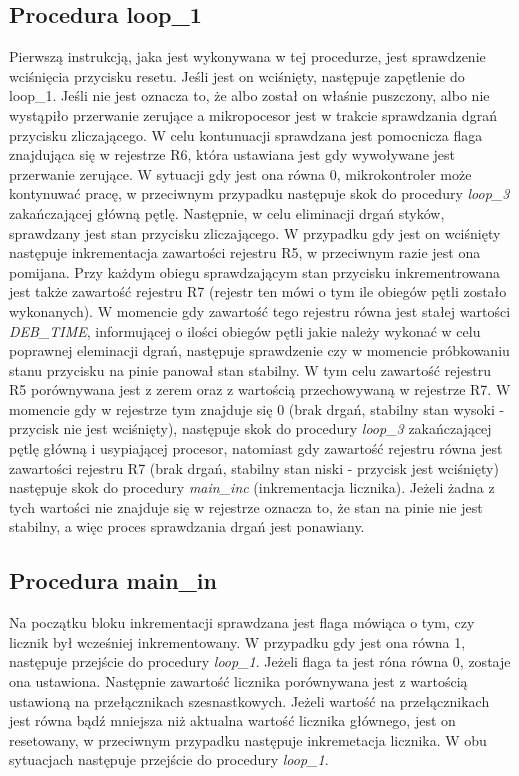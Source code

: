 \documentclass[fleqn]{article}
\begin{document}
\subsection{Procedura loop\_1}
		Pierwszą instrukcją, jaka jest wykonywana w tej procedurze, jest sprawdzenie wciśnięcia przycisku resetu. Jeśli jest on wciśnięty, następuje zapętlenie do loop\_1. Jeśli nie jest oznacza to, że albo został on właśnie puszczony, albo nie wystąpiło przerwanie zerujące a mikropocesor jest w trakcie sprawdzania dgrań przycisku zliczającego. W celu kontunuacji sprawdzana jest pomocnicza flaga znajdująca się w rejestrze R6, która ustawiana jest gdy wywoływane jest przerwanie zerujące. W sytuacji gdy jest ona równa 0, mikrokontroler może kontynuwać pracę, w przeciwnym przypadku następuje skok do procedury \textit{loop\_3} zakańczającej główną pętlę. Następnie, w celu eliminacji drgań styków, sprawdzany jest stan przycisku zliczającego. W przypadku gdy jest on wciśnięty następuje inkrementacja zawartości rejestru R5, w przeciwnym razie jest ona pomijana. Przy każdym obiegu sprawdzającym stan przycisku inkrementrowana jest także zawartość rejestru R7 (rejestr ten mówi o tym ile obiegów pętli zostało wykonanych). W momencie gdy zawartość tego rejestru równa jest stałej wartości \textit{DEB\_TIME}, informującej o ilości obiegów pętli jakie należy wykonać w celu poprawnej eleminacji dgrań, następuje sprawdzenie czy w momencie próbkowaniu stanu przycisku na pinie panował stan stabilny. W tym celu zawartość rejestru R5 porównywana jest z zerem oraz z wartością przechowywaną w rejestrze R7. W momencie gdy w rejestrze tym znajduje się 0 (brak drgań, stabilny stan wysoki - przycisk nie jest wciśnięty), następuje skok do procedury \textit{loop\_3} zakańczającej pętlę główną i usypiającej procesor, natomiast gdy zawartość rejestru równa jest zawartości rejestru R7 (brak drgań, stabilny stan niski - przycisk jest wciśnięty) następuje skok do procedury \textit{main\_inc} (inkrementacja licznika). Jeżeli żadna z tych wartości nie znajduje się w rejestrze oznacza to, że stan na pinie nie jest stabilny, a więc proces sprawdzania drgań jest ponawiany.

\subsection{Procedura main\_in}
		Na początku bloku inkrementacji sprawdzana jest flaga mówiąca o tym, czy licznik był wcześniej inkrementowany. W przypadku gdy jest ona równa 1, następuje przejście do procedury \textit{loop\_1}. Jeżeli flaga ta jest róna równa 0, zostaje ona ustawiona. Następnie zawartość licznika porównywana jest z wartością ustawioną na przełącznikach szesnastkowych. Jeżeli wartość na przełącznikach jest równa bądź mniejsza niż aktualna wartość licznika głównego, jest on resetowany, w przeciwnym przypadku następuje inkremetacja licznika. W obu sytuacjach następuje przejście do procedury \textit{loop\_1}.
\end{document}
